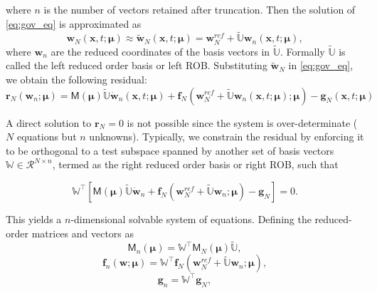 \documentclass[11pt]{article}
\renewcommand{\vec}[1]{\mathbf{#1}}
\newcommand{\mat}[1]{\mathsf{#1}}
\begin{document}
    where $n$ is the number of vectors retained after truncation.
    Then the solution of \cref{eq:gov_eq} is approximated as
    \begin{equation}
    \vec{w}_N(\vec{x},t; \boldsymbol{\mu}) \approx \widetilde{\vec{w}}_N(\vec{x},t; \boldsymbol{\mu}) = \vec{w}^{ref}_N+\widetilde{\mathbb{U}}  \vec{w}_n(\vec{x},t; \boldsymbol{\mu}),
    \label{eq:w_ned_gal}
    \end{equation}
    where $\vec{w}_n$ are the reduced coordinates of the basis vectors in $\widetilde{\mathbb{U}}$.
    Formally $\widetilde{\mathbb{U}}$ is called the left reduced order basis or left ROB.
    Substituting $\widetilde{\vec{w}}_N$ in \cref{eq:gov_eq}, we obtain the following residual:
    \begin{equation}
    \vec{r}_{N}(\vec{w}_n;\boldsymbol{\mu}) = \mat{M}(\boldsymbol{\mu})\widetilde{\mathbb{U}}\dot{\vec{w}}_n(\vec{x},t; \boldsymbol{\mu}) + \vec{f}_N(\vec{w}^{ref}_N+\widetilde{\mathbb{U}}\vec{w}_n(\vec{x},t; \boldsymbol{\mu}); \boldsymbol{\mu}) - \vec{g}_N(\vec{x},t; \boldsymbol{\mu})
    \label{eq:residual_gov_eq_gal}
    \end{equation}


    A direct solution to $\vec{r}_N=0$ is not possible since the system is over-determinate ($N$ equations but $n$ unknowns).
    Typically, we constrain the residual by enforcing it to be orthogonal to a test subspace spanned by another set of basis vectors ${\mathbb{W}}\in\mathcal{R}^{N\times n}$, termed as the right reduced order basis or right ROB, such that

    \begin{equation}
    \mathbb{W}^\top \left[ \mat{M}(\boldsymbol{\mu}) \widetilde{\mathbb{U}} \dot{\vec{w}}_n + \vec{f}_N(\vec{w}^{ref}_N+\widetilde{\mathbb{U}} \vec{w}_n; \boldsymbol{\mu}) - \vec{g}_N \right] = 0.
    \label{eq:PG_projection}
    \end{equation}

    This yields a $n$-dimensional solvable system of equations.
    Defining the reduced-order matrices and vectors as
    \begin{equation}
    \mat{M}_{n}(\boldsymbol{\mu}) = \mathbb{W}^\top \mat{M}_{N}(\boldsymbol{\mu}) \widetilde{\mathbb{U}},
    \end{equation}
    \begin{equation}
    \vec{f}_n(\vec{w}; \boldsymbol{\mu}) = \mathbb{W}^\top \vec{f}_N(\vec{w}^{ref}_N+\widetilde{\mathbb{U}} \vec{w}_n; \boldsymbol{\mu}),
    \end{equation}
    \begin{equation}
    \vec{g}_n = \mathbb{W}^\top \vec{g}_N,
    \end{equation}
\end{document}
